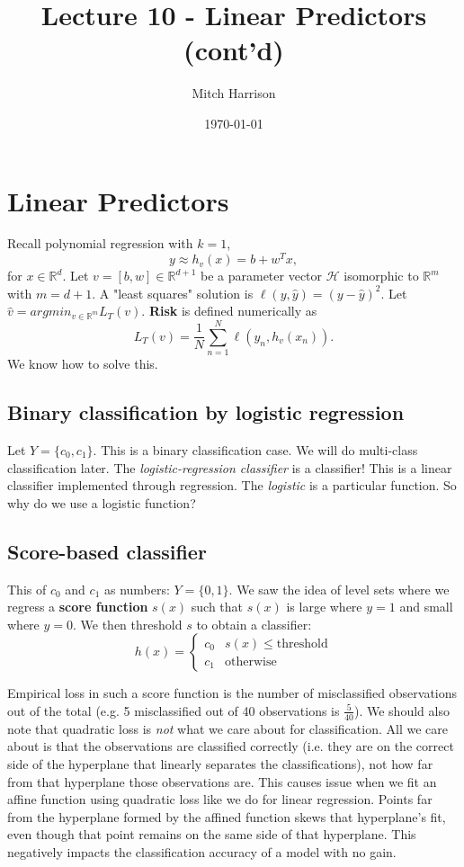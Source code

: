 \documentclass[titlepage, 12pt, leqno]{article}
\title{\Huge{Lecture 10 - Linear Predictors (cont'd)}}
\author{\large{Mitch Harrison}}
\date{\today}
\begin{document}
\setlength{\parskip}{1\baselineskip}
\setlength{\parindent}{15pt}
\maketitle
\tableofcontents
\newpage


\section{Linear Predictors}

Recall polynomial regression with $k=1$,
\[
y \approx h_{v}(x) = b + w^{T}x,
\]
for $x \in \mathbb{R}^{d}$. Let $v = [b,w] \in \mathbb{R}^{d+1}$ be a parameter
vector $ \mathcal{H}$ isomorphic to $ \mathbb{R}^{m}$ with $m = d+1$. A "least
squares" solution is $\ell(y,\hat y) = (y - \hat y)^{2}$. Let
$\hat v = argmin_{v \in  \mathbb{R}^{m}}L_{T}(v)$. \textbf{Risk} is defined
numerically as
\[
    L_{T}(v) = \frac{1}{N}\sum_{n=1}^{N}\ell(y_{n}, h_{v}(x_{n})).
\]
We know how to solve this.

\subsection{Binary classification by logistic regression}
Let $Y = \{c_{0}, c_{1}\}$. This is a binary classification case. We will do 
multi-class classification later. The \textit{logistic-regression classifier} is a
classifier! This is a linear classifier implemented through regression. The
\textit{logistic} is a particular function. So why do we use a logistic function?

\subsection{Score-based classifier}
This of $c_{0}$ and $c_{1}$ as numbers: $Y = \{0,1\}$. We saw the idea of level
sets where we regress a \textbf{score function} $s(x)$ such that $s(x)$ is large
where $y=1$ and small where $y=0$. We then threshold $s$ to obtain a classifier:
\[
h(x) = 
\begin{cases}
    c_0 & s(x) \le \text{threshold} \\
    c_{1} & \text{otherwise}
\end{cases}
\]

Empirical loss in such a score function is the number of misclassified 
observations out of the total (e.g. 5 misclassified out of 40 observations is
$\frac{5}{40}$). We should also note that quadratic loss is \textit{not} what we
care about for classification. All we care about is that the observations are 
classified correctly (i.e. they are on the correct side of the hyperplane that
linearly separates the classifications), not how far from that hyperplane those
observations are. This causes issue when we fit an affine function using 
quadratic loss like we do for linear regression. Points far from the hyperplane
formed by the affined function skews that hyperplane's fit, even though that 
point remains on the same side of that hyperplane. This negatively impacts the
classification accuracy of a model with no gain.
\end{document}
